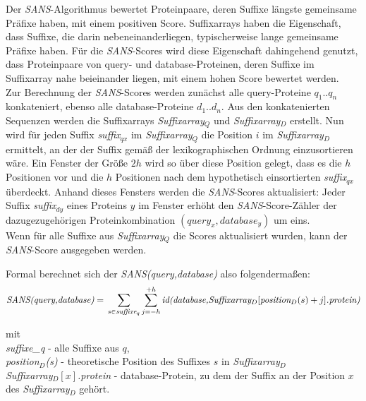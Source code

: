 \documentclass{article}
\begin{document}
Der \emph{SANS}-Algorithmus bewertet Proteinpaare, deren Suffixe längste gemeinsame
Präfixe haben, mit einem positiven Score. Suffixarrays haben die Eigenschaft,
dass Suffixe, die darin nebeneinanderliegen, typischerweise lange
gemeinsame Präfixe haben. Für die  \emph{SANS}-Scores wird diese Eigenschaft dahingehend
genutzt, dass Proteinpaare von query- und database-Proteinen, deren Suffixe im
Suffixarray nahe beieinander liegen, mit einem hohen Score bewertet werden.\\
Zur Berechnung der  \emph{SANS}-Scores werden zunächst alle query-Proteine $q_1..q_n$ konkateniert, ebenso alle database-Proteine $d_1..d_n$. 
Aus den konkatenierten Sequenzen werden die Suffixarrays \emph{Suffixarray$_Q$} und \emph{Suffixarray$_D$} erstellt. 
Nun wird für jeden Suffix \emph{suffix$_{qx}$} im \emph{Suffixarray$_Q$} die
Position $i$ im \emph{Suffixarray$_D$} ermittelt, an der der Suffix gemäß der lexikographischen Ordnung einzusortieren wäre. 
Ein Fenster der Größe $2h$ wird so über diese Position gelegt, dass es die $h$
Positionen vor und die $h$ Positionen nach dem hypothetisch einsortierten
\emph{suffix$_{qx}$} überdeckt. 
Anhand dieses Fensters werden die \emph{SANS}-Scores aktualisiert: 
Jeder Suffix \emph{suffix$_{dy}$} eines Proteins $y$ im Fenster erhöht den  \emph{SANS}-Score-Zähler der dazugezugehörigen Proteinkombination $(query_x,database_y)$ um eins. \\
Wenn für alle Suffixe aus \emph{Suffixarray$_Q$} die Scores aktualisiert wurden, kann der  \emph{SANS}-Score ausgegeben werden.

Formal berechnet sich der \emph{SANS(query,database)} also folgendermaßen:\\

 \begin{equation*}
   \text{\emph{SANS(query,database)}} = \\ \sum_{s \in \text{\emph{suffixe$_q$}}} \sum_{j=-h}^{+h}
  \text{\emph{id(database,Suffixarray$_D[$position$_D(s)  +j]$.protein)}} 
\end{equation*}

mit\\
\hspace{1pc} \emph{suffixe\_q} - alle Suffixe aus $q$,\\
\hspace{1pc} \emph{position$_D$(s)} - theoretische Position des Suffixes $s$ in \emph{Suffixarray$_D$} \\
\hspace{1pc} \emph{Suffixarray$_D[x]$.protein} - database-Protein, zu dem der Suffix an der Position $x$ des \emph{Suffixarray$_D$} gehört. \\
\end{document}
